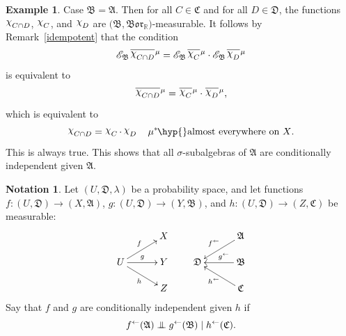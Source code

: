 \documentclass[
twoside=true,
paper=letter,
fontsize=9pt,
pagesize=auto,
leqno,
openany,
headsepline,
overfullrule,
]{scrbook}
\theoremstyle{plain}
\theoremstyle{plain}
\theoremstyle{definition}
\newtheorem{example}[thm]{Example}
\newtheorem{notn}[thm]{Notation}
\theoremstyle{bfnoteitalic}
\theoremstyle{bfnoteroman}
\newcommand{\sigalg}[1]{\mathfrak{#1}}
\newcommand{\cali}[1]{\mathscr{#1}}
\newcommand{\condexpsub}[2]
{\mathop{\cali{E}\hspace{-1.5pt}}\nolimits_{#2}\hspace{-1pt}#1}
\newcommand{\borel}{\mathfrak{Bor}}
\newcommand{\textsigma}{\hbox{\large{$\sigma$}}\kern-1pt}
\newcommand{\charfunction}[1]{\mathop{{\raisebox{2pt}{$\chi$}}_{#1}}}
\newcommand{\preimage}[1]{\mathop{#1^{\leftarrow}}}
\newcommand{\R}{\mathbb{R}}
\newcommand{\meets}{\cap}
\newcommand{\sigmaalgebra}{\sigalg{A}}
\newcommand{\sigmaalgebraii}{\sigalg{B}}
\newcommand{\sigmaalgebraiii}{\sigalg{C}}
\newcommand{\sigmaalgebraiv}{\sigalg{D}}
\newcommand{\kernast}{\ast\kern-1pt}
\newcommand{\funcf}{f}
\newcommand{\funcg}{g}
\newcommand{\funch}{h}
\newcommand{\function}{f}
\newcommand{\functionii}{g}
\newcommand{\functioniii}{h}
\newcommand{\measurespace}{X}
\newcommand{\measurespaceii}{Y}
\newcommand{\measurespaceiii}{Z}
\newcommand{\measure}{\mu}
\newcommand{\measureiii}{\lambda}
\newcommand{\setiii}{C}
\newcommand{\setiv}{D}
\newcommand{\uspace}{U}%
\newcommand{\uspacesig}{\sigalg{D}}
\newcommand{\condindep}[3]{#1\perp\kern-6pt\perp #2\mid #3}
\newcommand*\xbar[1]{%
   \hbox{%
     \vbox{%
       \hrule height 0.4pt %
       \kern0.4ex%
       \hbox{%
         \ensuremath{#1}%
       }%
     }%
   }%
}
\newcommand{\lebclass}[1]{\hspace{.5pt}\xbar{#1}\hspace{0.5pt}}
\newcommand{\ellclass}[2]{\lebclass{#1}^{#2}}
\begin{document}
\begin{example}
Case $\sigmaalgebraii = \sigmaalgebra$.
Then for all $\setiii\in\sigmaalgebraiii$ and for all $\setiv\in\sigmaalgebraiv$,
the functions
$\charfunction{\setiii\meets\setiv}$, $\charfunction{\setiii}$,
and $\charfunction{\setiv}$ are
$\bigl( \sigmaalgebraii, \borel_\R \bigr)$\hyp{}measurable.
It follows by Remark~\ref{idempotent} that the condition
\[
\condexpsub{\ellclass{\charfunction{\setiii\meets\setiv}}{\measure}}{\sigmaalgebraii}
=
\condexpsub{\ellclass{\charfunction{\setiii}}{\measure}}{\sigmaalgebraii}
\cdot
\condexpsub{\ellclass{\charfunction{\setiv}}{\measure}}{\sigmaalgebraii}
\]
is equivalent to
\[
\ellclass{\charfunction{\setiii\meets\setiv}}{\measure}
=
\ellclass{\charfunction{\setiii}}{\measure}
\cdot
\ellclass{\charfunction{\setiv}}{\measure},
\]
which is equivalent to
\[
\charfunction{\setiii\meets\setiv}
=
\charfunction{\setiii}
\cdot
\charfunction{\setiv}
\quad\text{$\measure^\kernast$\hyp{}almost everywhere on $\measurespace$.}
\]
This is always true.
This shows that all \textsigma\hyp{}subalgebras of $\sigmaalgebra$ are conditionally independent given $\sigmaalgebra$.
\end{example}






\begin{notn}\label{conditionally_independent_functions}
Let
$(\uspace,\uspacesig,\measureiii)$
be a probability space, and let functions
$\function:(\uspace,\uspacesig)\to (\measurespace,\sigmaalgebra)$,
$\functionii:(\uspace,\uspacesig)\to (\measurespaceii,\sigmaalgebraii)$,
and
$\functioniii:(\uspace,\uspacesig)\to (\measurespaceiii,\sigmaalgebraiii)$
be measurable:
\[
\xymatrix@R=14pt@C=30pt{
 & \measurespace \\
 \uspace
 \ar[ur]^\function
 \ar[r]^\functionii
 \ar[dr]_\functioniii
 & \measurespaceii\\
 & \measurespaceiii \\
}
%
\qquad
%
\xymatrix@R=14pt@C=30pt{
 & \sigmaalgebra \ar[dl]_{\preimage{\function}} \\
 \uspacesig & \sigmaalgebraii \ar[l]_-{\quad \preimage{\functionii}}\\
 & \sigmaalgebraiii \ar[ul]^{\preimage{\functioniii}}\\
}
\]
Say that $\funcf$ and $\funcg$ are conditionally independent
given $\funch$ if
\[
\condindep{\preimage{\funcf}(\sigmaalgebra)}{\preimage{\funcg}(\sigmaalgebraii)}
{\preimage{\funch}(\sigmaalgebraiii)}.
\]
\end{notn}
\end{document}
